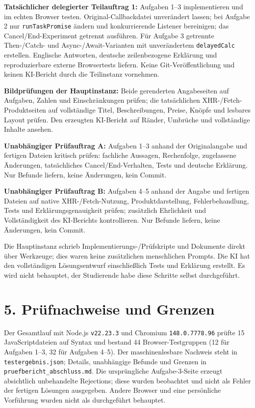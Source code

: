 \documentclass[a4paper,10pt]{article}
\begin{document}
\textbf{Tatsächlicher delegierter Teilauftrag 1:} Aufgaben 1--3 implementieren und im echten Browser testen. Original-Callbackdatei unverändert lassen; bei Aufgabe 2 nur \texttt{runTaskPromise} ändern und konkurrierende Listener bereinigen; das Cancel/End-Experiment getrennt ausführen. Für Aufgabe 3 getrennte Then-/Catch- und Async-/Await-Varianten mit unverändertem \texttt{delayedCalc} erstellen. Englische Antworten, deutsche zeilenbezogene Erklärung und reproduzierbare externe Browsertests liefern. Keine Git-Veröffentlichung und keinen KI-Bericht durch die Teilinstanz vornehmen.

\textbf{Bildprüfungen der Hauptinstanz:} Beide gerenderten Angabeseiten auf Aufgaben, Zahlen und Einschränkungen prüfen; die tatsächlichen XHR-/Fetch-Produktseiten auf vollständige Titel, Beschreibungen, Preise, Knöpfe und lesbares Layout prüfen. Den erzeugten KI-Bericht auf Ränder, Umbrüche und vollständige Inhalte ansehen.

\textbf{Unabhängiger Prüfauftrag A:} Aufgaben 1--3 anhand der Originalangabe und fertigen Dateien kritisch prüfen: fachliche Aussagen, Rechenfolge, zugelassene Änderungen, tatsächliches Cancel/End-Verhalten, Tests und deutsche Erklärung. Nur Befunde liefern, keine Änderungen, kein Commit.

\textbf{Unabhängiger Prüfauftrag B:} Aufgaben 4--5 anhand der Angabe und fertigen Dateien auf native XHR-/Fetch-Nutzung, Produktdarstellung, Fehlerbehandlung, Tests und Erklärungsgenauigkeit prüfen; zusätzlich Ehrlichkeit und Vollständigkeit des KI-Berichts kontrollieren. Nur Befunde liefern, keine Änderungen, kein Commit.

Die Hauptinstanz schrieb Implementierungs-/Prüfskripte und Dokumente direkt über Werkzeuge; dies waren keine zusätzlichen menschlichen Prompts. Die KI hat den vollständigen Lösungsentwurf einschließlich Tests und Erklärung erstellt. Es wird nicht behauptet, der Studierende habe diese Schritte selbst durchgeführt.

\section*{5. Prüfnachweise und Grenzen}
Der Gesamtlauf mit Node.js \texttt{v22.23.3} und Chromium \texttt{148.0.7778.96} prüfte 15 JavaScriptdateien auf Syntax und bestand 44 Browser-Testgruppen (12 für Aufgaben 1--3, 32 für Aufgaben 4--5). Der maschinenlesbare Nachweis steht in \texttt{testergebnis.json}; Details, unabhängige Befunde und Grenzen in \texttt{pruefbericht\_abschluss.md}. Die ursprüngliche Aufgabe-3-Seite erzeugt absichtlich unbehandelte Rejections; diese wurden beobachtet und nicht als Fehler der fertigen Lösungen ausgegeben. Andere Browser und eine persönliche Vorführung wurden nicht als durchgeführt behauptet.
\end{document}
